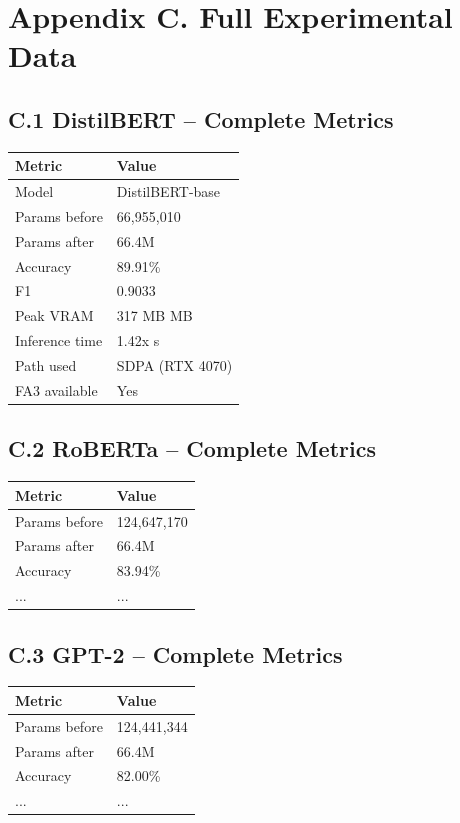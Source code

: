 \section{Appendix C. Full Experimental Data}

\subsection{C.1 DistilBERT -- Complete Metrics}

\begin{table}[H]
\centering
\small
\begin{tabular}{ll}
\toprule
\textbf{Metric} & \textbf{Value} \\
\midrule
Model & DistilBERT-base \\
Params before & 66,955,010 \\
Params after & 66.4M \\
Accuracy & 89.91\% \\
F1 & 0.9033 \\
Peak VRAM & 317 MB MB \\
Inference time & 1.42x s \\
Path used & SDPA (RTX 4070) \\
FA3 available & Yes \\
\bottomrule
\end{tabular}
\end{table}

\subsection{C.2 RoBERTa -- Complete Metrics}

\begin{table}[H]
\centering
\small
\begin{tabular}{ll}
\toprule
\textbf{Metric} & \textbf{Value} \\
\midrule
Params before & 124,647,170 \\
Params after & 66.4M \\
Accuracy & 83.94\% \\
... & ... \\
\bottomrule
\end{tabular}
\end{table}

\subsection{C.3 GPT-2 -- Complete Metrics}

\begin{table}[H]
\centering
\small
\begin{tabular}{ll}
\toprule
\textbf{Metric} & \textbf{Value} \\
\midrule
Params before & 124,441,344 \\
Params after & 66.4M \\
Accuracy & 82.00\% \\
... & ... \\
\bottomrule
\end{tabular}
\end{table}

